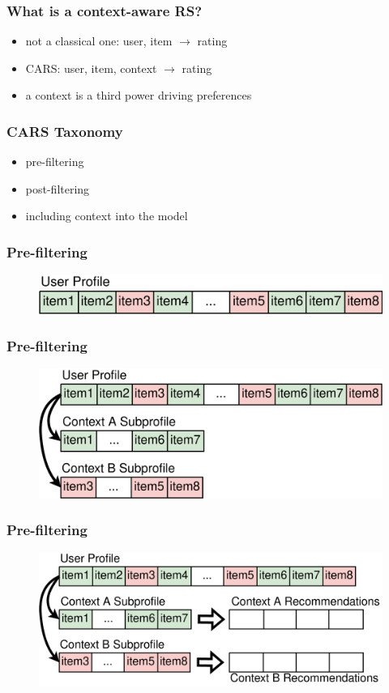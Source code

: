 \documentclass{beamer}
\begin{document}
\begin{frame}
  \frametitle{What is a context-aware RS?}
  \begin{itemize}
  \item not a classical one: user, item $\rightarrow$ rating
  \item CARS: user, item, context $\rightarrow$ rating
  \item a context is a third power driving preferences
  \end{itemize}
\end{frame}
\begin{frame}
  \frametitle{CARS Taxonomy}
  \begin{itemize}
  \item pre-filtering
  \item post-filtering
  \item including context into the model
  \end{itemize}
\end{frame}
\begin{frame}
  \frametitle{Pre-filtering}
\begin{figure}
\includegraphics[scale=0.2]{pre-filtering1}
\end{figure}
\end{frame}
\begin{frame}
  \frametitle{Pre-filtering}
\begin{figure}
\includegraphics[scale=0.2]{pre-filtering2}
\end{figure}
\end{frame}
\begin{frame}
  \frametitle{Pre-filtering}
\begin{figure}
\includegraphics[scale=0.2]{pre-filtering3}
\end{figure}
\end{frame}
\end{document}
